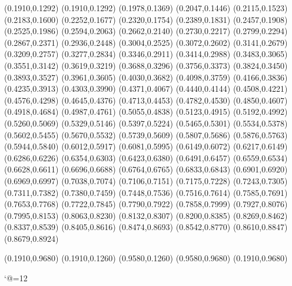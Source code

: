 \PST@Dotted(0.1910,0.1292)
(0.1910,0.1292)
(0.1978,0.1369)
(0.2047,0.1446)
(0.2115,0.1523)
(0.2183,0.1600)
(0.2252,0.1677)
(0.2320,0.1754)
(0.2389,0.1831)
(0.2457,0.1908)
(0.2525,0.1986)
(0.2594,0.2063)
(0.2662,0.2140)
(0.2730,0.2217)
(0.2799,0.2294)
(0.2867,0.2371)
(0.2936,0.2448)
(0.3004,0.2525)
(0.3072,0.2602)
(0.3141,0.2679)
(0.3209,0.2757)
(0.3277,0.2834)
(0.3346,0.2911)
(0.3414,0.2988)
(0.3483,0.3065)
(0.3551,0.3142)
(0.3619,0.3219)
(0.3688,0.3296)
(0.3756,0.3373)
(0.3824,0.3450)
(0.3893,0.3527)
(0.3961,0.3605)
(0.4030,0.3682)
(0.4098,0.3759)
(0.4166,0.3836)
(0.4235,0.3913)
(0.4303,0.3990)
(0.4371,0.4067)
(0.4440,0.4144)
(0.4508,0.4221)
(0.4576,0.4298)
(0.4645,0.4376)
(0.4713,0.4453)
(0.4782,0.4530)
(0.4850,0.4607)
(0.4918,0.4684)
(0.4987,0.4761)
(0.5055,0.4838)
(0.5123,0.4915)
(0.5192,0.4992)
(0.5260,0.5069)
(0.5329,0.5146)
(0.5397,0.5224)
(0.5465,0.5301)
(0.5534,0.5378)
(0.5602,0.5455)
(0.5670,0.5532)
(0.5739,0.5609)
(0.5807,0.5686)
(0.5876,0.5763)
(0.5944,0.5840)
(0.6012,0.5917)
(0.6081,0.5995)
(0.6149,0.6072)
(0.6217,0.6149)
(0.6286,0.6226)
(0.6354,0.6303)
(0.6423,0.6380)
(0.6491,0.6457)
(0.6559,0.6534)
(0.6628,0.6611)
(0.6696,0.6688)
(0.6764,0.6765)
(0.6833,0.6843)
(0.6901,0.6920)
(0.6969,0.6997)
(0.7038,0.7074)
(0.7106,0.7151)
(0.7175,0.7228)
(0.7243,0.7305)
(0.7311,0.7382)
(0.7380,0.7459)
(0.7448,0.7536)
(0.7516,0.7614)
(0.7585,0.7691)
(0.7653,0.7768)
(0.7722,0.7845)
(0.7790,0.7922)
(0.7858,0.7999)
(0.7927,0.8076)
(0.7995,0.8153)
(0.8063,0.8230)
(0.8132,0.8307)
(0.8200,0.8385)
(0.8269,0.8462)
(0.8337,0.8539)
(0.8405,0.8616)
(0.8474,0.8693)
(0.8542,0.8770)
(0.8610,0.8847)
(0.8679,0.8924)

\PST@Border(0.1910,0.9680)
(0.1910,0.1260)
(0.9580,0.1260)
(0.9580,0.9680)
(0.1910,0.9680)

\catcode`@=12
\fi
\endpspicture
